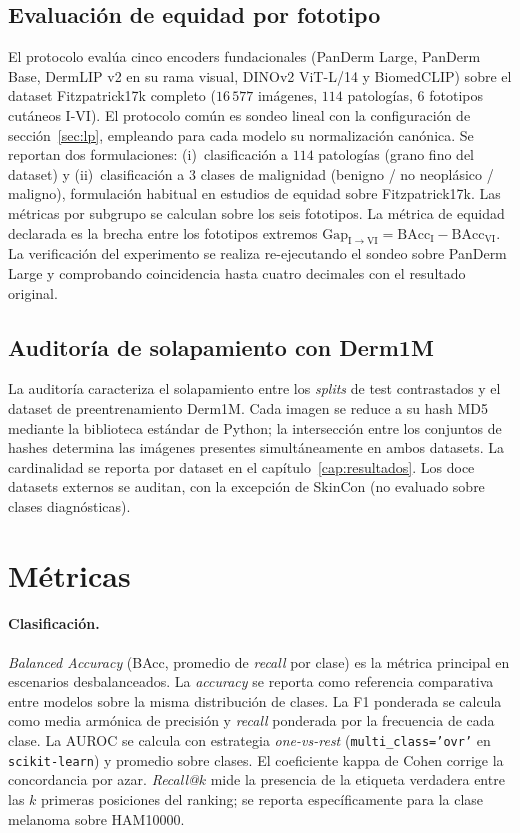\subsection{Evaluación de equidad por fototipo}
\label{sec:equidad}

El protocolo evalúa cinco encoders fundacionales (PanDerm Large,
PanDerm Base, DermLIP v2 en su rama visual, DINOv2 ViT-L/14 y
BiomedCLIP) sobre el dataset Fitzpatrick17k completo
($16\,577$ imágenes, $114$ patologías, $6$ fototipos
cutáneos I-VI). El protocolo común es sondeo lineal con la
configuración de secci\'on~\ref{sec:lp}, empleando para cada modelo su
normalización canónica. Se reportan dos formulaciones:
(i)~clasificación a $114$ patologías (grano fino del dataset)
y (ii)~clasificación a $3$ clases de malignidad
(benigno / no neoplásico / maligno), formulación habitual en
estudios de equidad sobre Fitzpatrick17k. Las métricas por subgrupo
se calculan sobre los seis fototipos. La métrica de equidad
declarada es la brecha entre los fototipos extremos
$\mathrm{Gap}_{\mathrm{I}\to\mathrm{VI}} =
\mathrm{BAcc}_{\mathrm{I}} - \mathrm{BAcc}_{\mathrm{VI}}$.
La verificación del experimento se realiza re-ejecutando el sondeo
sobre PanDerm Large y comprobando coincidencia hasta cuatro
decimales con el resultado original.

\subsection{Auditoría de solapamiento con Derm1M}
\label{sec:auditoria}

La auditoría caracteriza el solapamiento entre los \emph{splits} de
test contrastados y el dataset de preentrenamiento Derm1M. Cada
imagen se reduce a su hash MD5 mediante la biblioteca estándar de
Python; la intersección entre los conjuntos de hashes determina las
imágenes presentes simultáneamente en ambos datasets. La cardinalidad
se reporta por dataset en el capítulo~\ref{cap:resultados}. Los
doce datasets externos se auditan, con la excepción de SkinCon (no
evaluado sobre clases diagnósticas).

\section{Métricas}
\label{sec:metricas}

\paragraph{Clasificación.}
\emph{Balanced Accuracy} (BAcc, promedio de \emph{recall} por
clase) es la métrica principal en escenarios desbalanceados. La
\emph{accuracy} se reporta como referencia comparativa entre
modelos sobre la misma distribución de clases. La F1 ponderada se
calcula como media armónica de precisión y \emph{recall}
ponderada por la frecuencia de cada clase. La AUROC se calcula con
estrategia \emph{one-vs-rest} (\texttt{multi\_class='ovr'} en
\texttt{scikit-learn}) y promedio sobre clases. El coeficiente
kappa de Cohen corrige la concordancia por azar. \emph{Recall@$k$}
mide la presencia de la etiqueta verdadera entre las $k$ primeras
posiciones del ranking; se reporta específicamente para la clase
melanoma sobre HAM10000.

